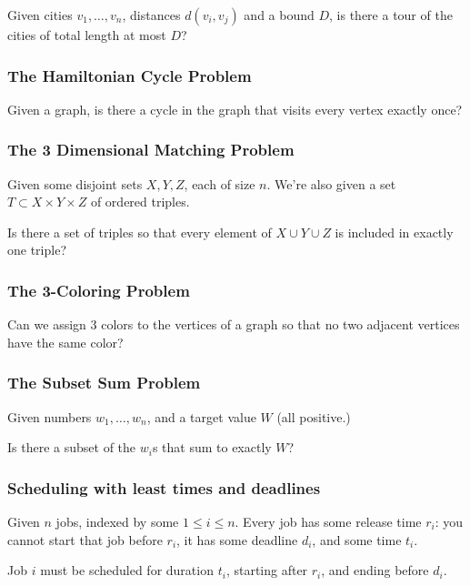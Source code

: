 \documentclass[12pt]{article}
\begin{document}
  Given cities $v_1, \dots, v_n$, distances $d(v_i, v_j)$ and a bound $D$, is
  there a tour of the cities of total length at most $D$?

  \subsubsection{The Hamiltonian Cycle Problem}

  Given a graph, is there a cycle in the graph that visits every vertex exactly
  once?

  \subsubsection{The 3 Dimensional Matching Problem}

  Given some disjoint sets $X, Y, Z$, each of size $n$. We're also given a set
  $T \subset X \times Y \times Z$ of ordered triples.

  Is there a set of triples so that every element of $X \cup Y \cup Z$ is
  included in exactly one triple?

  \subsubsection{The 3-Coloring Problem}

  Can we assign 3 colors to the vertices of a graph so that no two adjacent
  vertices have the same color?

  \subsubsection{The Subset Sum Problem}

  Given numbers $w_1, \dots, w_n$, and a target value $W$ (all positive.)

  Is there a subset of the $w_i$s that sum to exactly $W$?

  \subsubsection{Scheduling with least times and deadlines}

  Given $n$ jobs, indexed by some $1 \le i \le n$. Every job has some release
  time $r_i$: you cannot start that job before $r_i$, it has some deadline
  $d_i$, and some time $t_i$.

  Job $i$ must be scheduled for duration $t_i$, starting after $r_i$, and ending
  before $d_i$.
\end{document}
